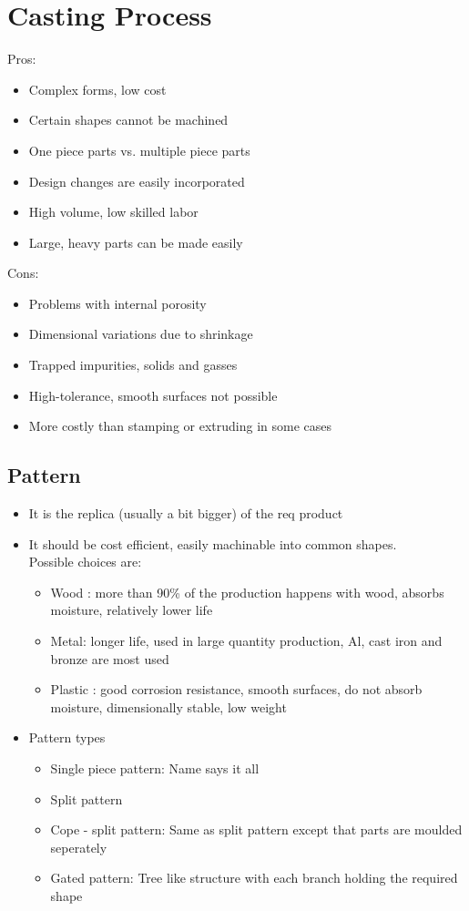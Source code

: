 \documentclass{article}
\begin{document}
\section{Casting Process}

Pros:
\begin{itemize}
	\item Complex forms, low cost
	\item Certain shapes cannot be machined
	\item One piece parts vs. multiple piece parts
	\item Design changes are easily incorporated
	\item High volume, low skilled labor
	\item Large, heavy parts can be made easily
\end{itemize}

Cons:
\begin{itemize}
	\item Problems with internal porosity
	\item Dimensional variations due to shrinkage
	\item Trapped impurities, solids and gasses
	\item High-tolerance, smooth surfaces not possible
	\item More costly than stamping or extruding in some cases
\end{itemize}

\subsection{Pattern} 
\begin{itemize}
	\item It is the replica (usually a bit bigger) of the req product 
	\item It should be cost efficient, easily machinable into common shapes.\\
	Possible choices are: 
	\begin{itemize}
		\item Wood : more than 90\% of the production happens with wood, absorbs moisture, relatively lower life
		\item Metal: longer life, used in large quantity production, Al, cast iron and bronze are most used
		\item Plastic : good corrosion resistance, smooth surfaces, do not absorb moisture, dimensionally stable, low weight
	\end{itemize}
	\item Pattern types
	\begin{itemize}
		\item Single piece pattern: Name says it all
		\item Split pattern
		\item Cope - split pattern: Same as split pattern except that parts are moulded seperately
		\item Gated pattern: Tree like structure with each branch holding the required shape
	\end{itemize}
\end{itemize}
\end{document}
